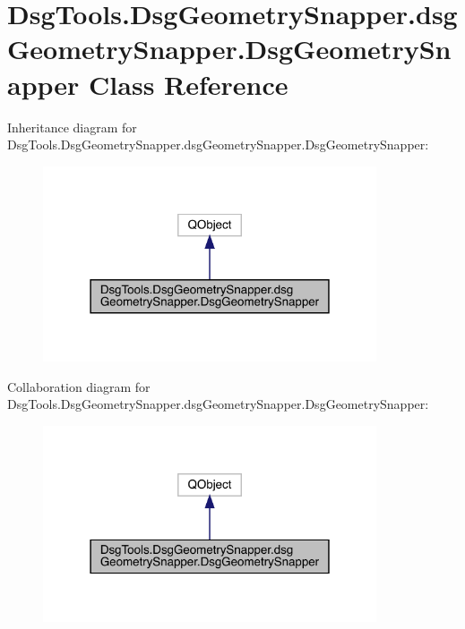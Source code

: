 \hypertarget{class_dsg_tools_1_1_dsg_geometry_snapper_1_1dsg_geometry_snapper_1_1_dsg_geometry_snapper}{}\section{Dsg\+Tools.\+Dsg\+Geometry\+Snapper.\+dsg\+Geometry\+Snapper.\+Dsg\+Geometry\+Snapper Class Reference}
\label{class_dsg_tools_1_1_dsg_geometry_snapper_1_1dsg_geometry_snapper_1_1_dsg_geometry_snapper}


Inheritance diagram for Dsg\+Tools.\+Dsg\+Geometry\+Snapper.\+dsg\+Geometry\+Snapper.\+Dsg\+Geometry\+Snapper\+:
\nopagebreak
\begin{figure}[H]
\begin{center}
\leavevmode
\includegraphics[width=279pt]{class_dsg_tools_1_1_dsg_geometry_snapper_1_1dsg_geometry_snapper_1_1_dsg_geometry_snapper__inherit__graph}
\end{center}
\end{figure}


Collaboration diagram for Dsg\+Tools.\+Dsg\+Geometry\+Snapper.\+dsg\+Geometry\+Snapper.\+Dsg\+Geometry\+Snapper\+:
\nopagebreak
\begin{figure}[H]
\begin{center}
\leavevmode
\includegraphics[width=279pt]{class_dsg_tools_1_1_dsg_geometry_snapper_1_1dsg_geometry_snapper_1_1_dsg_geometry_snapper__coll__graph}
\end{center}
\end{figure}
